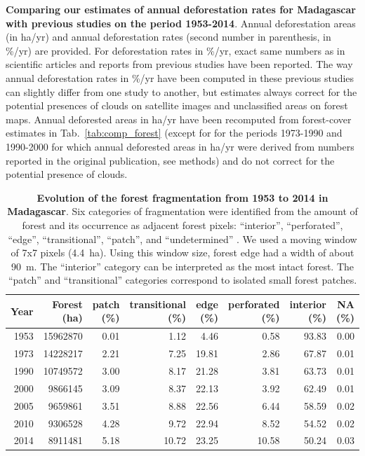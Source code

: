 \documentclass[a4paper, 12pt, leqno]{article} %
\begin{document}
\begin{table}[!h]
  \caption{\textbf{Comparing our estimates of annual deforestation
      rates for Madagascar with previous studies on the period
      1953-2014}. Annual deforestation areas (in ha/yr) and annual
    deforestation rates (second number in parenthesis, in \%/yr) are
    provided. For deforestation rates in \%/yr, exact same numbers as
    in scientific articles and reports from previous studies
    \citep{Harper2007, MEFT2009, ONE2015} have been reported. The way
    annual deforestation rates in \%/yr have been computed in these
    previous studies can slightly differ from one study to another, but
    estimates always correct for the potential presences of clouds on
    satellite images and unclassified areas on forest maps. Annual
    deforested areas in ha/yr have been recomputed from forest-cover
    estimates in Tab.~\ref{tab:comp_forest} (except for
    \citet{Harper2007} for the periods 1973-1990 and 1990-2000 for
    which annual deforested areas in ha/yr were derived from numbers
    reported in the original publication, see methods) and do not
    correct for the potential presence of clouds.}

  \label{tab:comp_defor}
\end{table}

\newpage

\begin{table}[!h]

  {\small
  \begin{longtable}[]{@{}rrrrrrrr@{}}
    \toprule
    Year & Forest (ha) & patch (\%) & transitional (\%) & edge (\%) &
    perforated (\%) & interior (\%) & NA (\%)\tabularnewline
    \midrule
    \endhead
    1953 & 15962870 & 0.01 & 1.12 & 4.46 & 0.58 & 93.83 &
    0.00\tabularnewline
    1973 & 14228217 & 2.21 & 7.25 & 19.81 & 2.86 & 67.87 &
    0.01\tabularnewline
    1990 & 10749572 & 3.00 & 8.17 & 21.28 & 3.81 & 63.73 &
    0.01\tabularnewline
    2000 & 9866145 & 3.09 & 8.37 & 22.13 & 3.92 & 62.49 &
    0.01\tabularnewline
    2005 & 9659861 & 3.51 & 8.88 & 22.56 & 6.44 & 58.59 &
    0.02\tabularnewline
    2010 & 9306528 & 4.28 & 9.72 & 22.94 & 8.52 & 54.52 &
    0.02\tabularnewline
    2014 & 8911481 & 5.18 & 10.72 & 23.25 & 10.58 & 50.24 &
    0.03\tabularnewline
    \bottomrule
  \end{longtable}}
  \addtocounter{table}{-1}

  \caption{\textbf{Evolution of the forest fragmentation from 1953 to 2014
      in Madagascar}. Six categories of fragmentation were identified from the
    amount of forest and its occurrence as adjacent forest pixels:
    ``interior'', ``perforated'', ``edge'', ``transitional'', ``patch'', and
    ``undetermined'' \citep{Riitters2000}. We used a moving window of 7x7
    pixels (4.4~ha). Using this window size, forest edge had a width of
    about 90~m. The ``interior'' category can be interpreted as the most
    intact forest. The ``patch'' and ``transitional'' categories correspond
    to isolated small forest patches.}

  \label{tab:frag}
\end{table}
\end{document}
